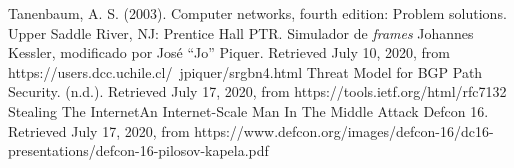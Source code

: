 \documentclass{article}
\begin{document}
\begin{thebibliography}{9}
 Tanenbaum, A. S. (2003). Computer networks, fourth edition: Problem solutions. Upper Saddle River, NJ: Prentice Hall PTR.
Simulador de \textit{frames} Johannes Kessler, modificado por José ``Jo'' Piquer. Retrieved July 10, 2020, from https://users.dcc.uchile.cl/~jpiquer/srgbn4.html
 Threat Model for BGP Path Security. (n.d.). Retrieved July 17, 2020, from https://tools.ietf.org/html/rfc7132
 Stealing The InternetAn Internet-Scale Man In The Middle Attack Defcon 16. Retrieved July 17, 2020, from https://www.defcon.org/images/defcon-16/dc16-presentations/defcon-16-pilosov-kapela.pdf
\end{thebibliography}
\end{document}
